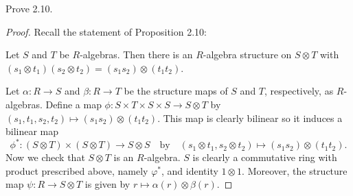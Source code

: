 \newpage
\begin{problem}
Prove 2.10.
\end{problem}
\begin{proof}
Recall the statement of Proposition 2.10:
\begin{proposition*}
Let $S$ and $T$ be $R$-algebras. Then there is an $R$-algebra
structure on $S\otimes T$ with $(s_1\otimes t_1)(s_2\otimes
t_2)=(s_1s_2)\otimes (t_1t_2)$.
\end{proposition*}
Let $\alpha\colon R\to S$ and $\beta\colon R\to T$ be the
structure maps of $S$ and $T$, respectively, as $R$-algebras.
Define a map $\phi\colon S\times T\times S\times S\to S\otimes T$
by $(s_1,t_1,s_2,t_2)\mapsto(s_1s_2)\otimes (t_1t_2)$. This map
is clearly bilinear so it induces a bilinear map
\[
\phi^*\colon(S\otimes T)\times(S\otimes T)\to S\otimes S
\quad\text{by}\quad
(s_1\otimes t_1,s_2\otimes
t_2)\mapsto(s_1s_2)\otimes (t_1t_2).
\]
Now we check that $S\otimes T$ is an $R$-algebra. $S$ is clearly
a commutative ring with product prescribed above, namely
$\varphi^*$, and identity $1\otimes 1$. Moreover, the structure
map $\psi\colon R\to S\otimes T$ is given by
$r\mapsto\alpha(r)\otimes\beta(r)$.
\end{proof}

